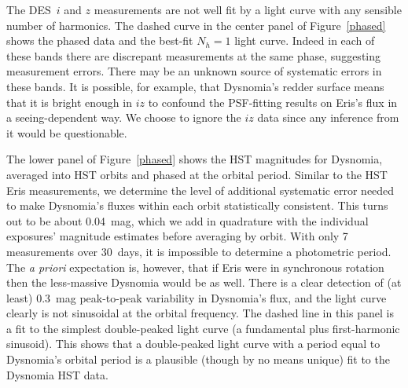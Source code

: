 \documentclass[onecolumn]{aastex631}
\newcommand{\des}{DES}
\begin{document}
The \des\ $i$ and $z$ measurements are not well fit by a light curve with any sensible number of harmonics. The dashed curve in the center panel of Figure~\ref{phased} shows the phased data and the best-fit $N_h=1$ light curve. Indeed in each of these bands there are discrepant measurements at the same phase, suggesting measurement errors.  There may be an unknown source of systematic errors in these bands.  It is possible, for example, that Dysnomia's redder surface means that it is bright enough in $iz$ to confound the PSF-fitting results on Eris's flux in a seeing-dependent way.  We choose to ignore the $iz$ data since any inference from it would be questionable.

The lower panel of Figure~\ref{phased} shows the HST magnitudes for Dysnomia, averaged into HST orbits and phased at the orbital period. Similar to the HST Eris measurements, we determine the level of additional systematic error needed to make Dysnomia's fluxes within each orbit statistically consistent. This turns out to be about 0.04~mag, which we add in quadrature with the individual exposures' magnitude estimates before averaging by orbit. With only 7 measurements over 30~days, it is impossible to determine a photometric period. The {\it a priori} expectation is, however, that if Eris were in synchronous rotation then the less-massive Dysnomia would be as well. There is a clear detection of (at least) 0.3~mag peak-to-peak variability in Dysnomia's flux, and the light curve clearly is not sinusoidal at the orbital frequency.  The dashed line in this panel is a fit to the simplest double-peaked light curve (a fundamental plus first-harmonic sinusoid). This shows that a double-peaked light curve with a period equal to Dysnomia's orbital period is a plausible (though by no means unique) fit to the Dysnomia HST data.
\end{document}
